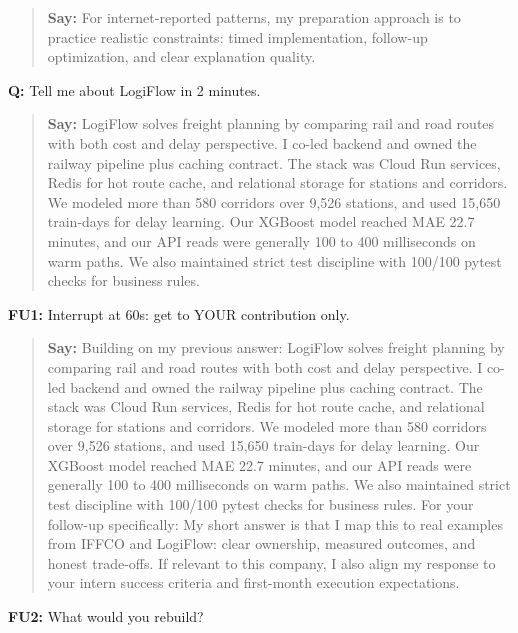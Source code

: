 \documentclass[9pt,a4paper]{article}
\begin{document}
\begin{quote}\small\textbf{Say:} For internet-reported patterns, my preparation approach is to practice realistic constraints: timed implementation, follow-up optimization, and clear explanation quality.\end{quote}
\vspace{2mm}
\textbf{Q:} Tell me about LogiFlow in 2 minutes.

\begin{quote}\small\textbf{Say:} LogiFlow solves freight planning by comparing rail and road routes with both cost and delay perspective. I co-led backend and owned the railway pipeline plus caching contract. The stack was Cloud Run services, Redis for hot route cache, and relational storage for stations and corridors. We modeled more than 580 corridors over 9,526 stations, and used 15,650 train-days for delay learning. Our XGBoost model reached MAE 22.7 minutes, and our API reads were generally 100 to 400 milliseconds on warm paths. We also maintained strict test discipline with 100/100 pytest checks for business rules.\end{quote}
\vspace{2mm}
\textbf{FU1:} Interrupt at 60s: get to YOUR contribution only.

\begin{quote}\small\textbf{Say:} Building on my previous answer: LogiFlow solves freight planning by comparing rail and road routes with both cost and delay perspective. I co-led backend and owned the railway pipeline plus caching contract. The stack was Cloud Run services, Redis for hot route cache, and relational storage for stations and corridors. We modeled more than 580 corridors over 9,526 stations, and used 15,650 train-days for delay learning. Our XGBoost model reached MAE 22.7 minutes, and our API reads were generally 100 to 400 milliseconds on warm paths. We also maintained strict test discipline with 100/100 pytest checks for business rules. For your follow-up specifically: My short answer is that I map this to real examples from IFFCO and LogiFlow: clear ownership, measured outcomes, and honest trade-offs. If relevant to this company, I also align my response to your intern success criteria and first-month execution expectations.\end{quote}
\vspace{2mm}
\textbf{FU2:} What would you rebuild?
\end{document}
